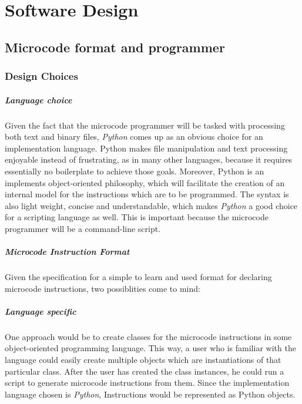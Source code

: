 \chapter{Software Design}

\section{Microcode format and programmer}

\subsection{Design Choices}

\paragraph{Language choice}
Given the fact that the microcode programmer will be tasked with processing
both text and binary files, \emph{Python} \cite{py} comes up as an obvious choice
for an implementation language. Python makes file manipulation and text
processing enjoyable instead of frustrating, as in many other languages, because it
requires essentially no boilerplate to achieve those goals. Moreover, Python is an
implements object-oriented philosophy, which will facilitate the creation of an internal
model for the instructions which are to be programmed. The syntax is also light weight,
concise and understandable, which makes \emph{Python} a good choice for a scripting
language as well. This is important because the microcode programmer will be a command-line
script.

\paragraph{Microcode Instruction Format}
Given the specification for a simple to learn and used format for declaring
microcode instructions, two possiblities come to mind:

\paragraph{Language specific} One approach would be to create classes for the
microcode instructions in some object-oriented programming language. This way,
a user who is familiar with the language could easily create multiple objects which
are instantiations of that particular class. After the user has created the class
instances, he could run a script to generate microcode instructions from them.
Since the implementation language chosen is \emph{Python}, Instructions would be
represented as Python objects.

